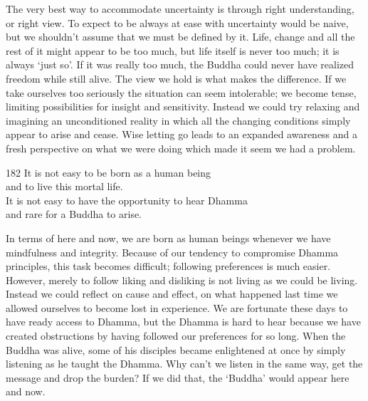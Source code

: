 \begin{dhpRefl}
  The very best way to accommodate uncertainty is through right understanding,
  or right view. To expect to be always at ease with uncertainty would be naive,
  but we shouldn’t assume that we must be defined by it. Life, change and all
  the rest of it might appear to be too much, but life itself is never too much;
  it is always ‘just so’. If it was really too much, the Buddha could never have
  realized freedom while still alive. The view we hold is what makes the
  difference. If we take ourselves too seriously the situation can seem
  intolerable; we become tense, limiting possibilities for insight and
  sensitivity. Instead we could try relaxing and imagining an unconditioned
  reality in which all the changing conditions simply appear to arise and cease.
  Wise letting go leads to an expanded awareness and a fresh perspective on what
  we were doing which made it seem we had a problem.
\end{dhpRefl}


\begin{dhpVerse}{182}
\label{dhp-182}
It is not easy to be born as a human being\\
and to live this mortal life.\\
It is not easy to have the opportunity to hear Dhamma\\
and rare for a Buddha to arise.
\end{dhpVerse}

\begin{dhpRefl}
  In terms of here and now, we are born as human beings whenever we have
  mindfulness and integrity. Because of our tendency to compromise Dhamma
  principles, this task becomes difficult; following preferences is much easier.
  However, merely to follow liking and disliking is not living as we could be
  living. Instead we could reflect on cause and effect, on what happened last
  time we allowed ourselves to become lost in experience. We are fortunate these
  days to have ready access to Dhamma, but the Dhamma is hard to hear because we
  have created obstructions by having followed our preferences for so long. When
  the Buddha was alive, some of his disciples became enlightened at once by
  simply listening as he taught the Dhamma. Why can’t we listen in the same way,
  get the message and drop the burden? If we did that, the `Buddha' would appear
  here and now.
\end{dhpRefl}

